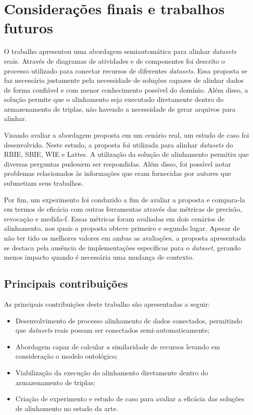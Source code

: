 \chapter{Considerações finais e trabalhos futuros}
\label{cap:conclusao}
O trabalho apresentou uma abordagem semiautomática para alinhar \textit{datasets} reais. Através de diagramas de atividades e de componentes foi descrito o processo utilizado para conectar recursos de diferentes \textit{datasets}. Essa proposta se faz necessária justamente pela necessidade de soluções capazes de alinhar dados de forma confiável e com menor conhecimento possível do domínio. Além disso, a solução permite que o alinhamento seja executado diretamente dentro do armazenamento de triplas, não havendo a necessidade de gerar arquivos para alinhar. 

Visando avaliar a abordagem proposta em um cenário real, um estudo de caso foi desenvolvido. Neste estudo, a proposta foi utilizada para alinhar \textit{datasets} do RBIE, SBIE, WIE e Lattes. A utilização da solução de alinhamento permitiu que diversas perguntas pudessem ser respondidas. Além disso, foi possível notar problemas relacionados às informações que eram fornecidas por autores que submetiam seus trabalhos.

Por fim, um experimento foi conduzido a fim de avaliar a proposta e compara-la em termos de eficácia com outras ferramentas através das métricas de precisão, revocação e medida-f. Essas métricas foram avaliadas em dois cenários de alinhamento, nos quais a proposta obteve primeiro e segundo lugar. Apesar de não ter tido os melhores valores em ambas as avaliações, a proposta apresentada se destaca pela ausência de implementações específicas para o \textit{dataset}, gerando menos impacto quando é necessária uma mudança de contexto.

\section{Principais contribuições}
As principais contribuições deste trabalho são apresentadas a seguir:
\begin{itemize}
\item Desenvolvimento de processo alinhamento de dados conectados, permitindo que \textit{datasets} reais possam ser conectados semi-automaticamente;
\item Abordagem capaz de calcular a similaridade de recursos levando em consideração o modelo ontológico;
\item Viabilização da execução do alinhamento diretamente dentro do armazenamento de triplas;
\item  Criação de experimento e estudo de caso para avaliar a eficácia das soluções de alinhamento no estado da arte.
\end{itemize}

